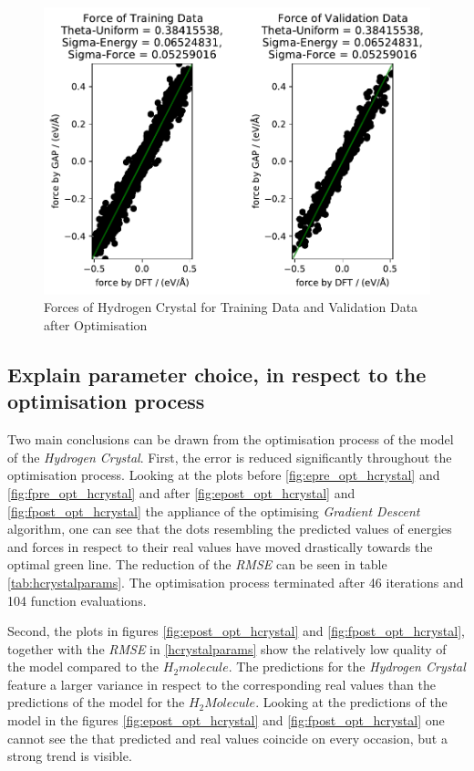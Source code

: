 \begin{figure}
	\includegraphics{../Bilder/Opt_Forces_HCrystal.pdf}
	\caption{Forces  of Hydrogen Crystal for Training Data and Validation Data after Optimisation}
	\label{fpost_opt_hcrystal}
\end{figure}

\subsection{Explain parameter choice, in respect to the optimisation process}
\label{subsection:5.2.2}
Two main conclusions can be drawn from the optimisation process of the model of the  \textit{Hydrogen Crystal}. First, the  error is reduced significantly throughout the optimisation process. Looking at the plots before  \ref{fig:epre_opt_hcrystal} and \ref{fig:fpre_opt_hcrystal} and after  \ref{fig:epost_opt_hcrystal} and \ref{fig:fpost_opt_hcrystal} the appliance of the optimising \textit{Gradient Descent} algorithm, one can see that the dots resembling the predicted values of energies and forces in respect to their real values have moved drastically towards the optimal green line. The reduction of the \textit{RMSE} can be seen in table \ref{tab:hcrystalparams}.  The optimisation process terminated after 46 iterations and 104 function evaluations. 

Second,  the plots in figures \ref{fig:epost_opt_hcrystal} and \ref{fig:fpost_opt_hcrystal}, together with the \textit{RMSE} in \ref{hcrystalparams} show the relatively low quality of the model compared to the \textit{$H_2 molecule$}. The predictions for the \textit{Hydrogen Crystal} feature a larger variance in respect to the corresponding real values than the predictions of the model for the  \textit{$H_2 Molecule$}. 
Looking at the predictions of the model in the figures \ref{fig:epost_opt_hcrystal} and \ref{fig:fpost_opt_hcrystal} one cannot see the that predicted and real values coincide on every occasion, but a strong trend is visible. 

